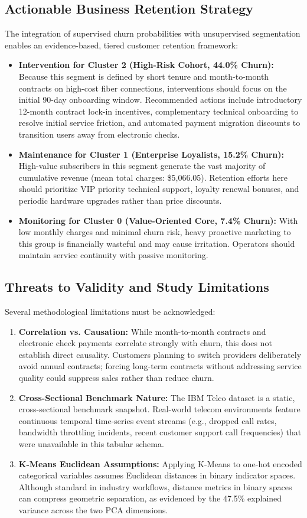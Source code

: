 \subsection{Actionable Business Retention Strategy}
The integration of supervised churn probabilities with unsupervised segmentation enables an evidence-based, tiered customer retention framework:
\begin{itemize}
    \item \textbf{Intervention for Cluster 2 (High-Risk Cohort, 44.0\% Churn):} Because this segment is defined by short tenure and month-to-month contracts on high-cost fiber connections, interventions should focus on the initial 90-day onboarding window. Recommended actions include introductory 12-month contract lock-in incentives, complementary technical onboarding to resolve initial service friction, and automated payment migration discounts to transition users away from electronic checks.
    \item \textbf{Maintenance for Cluster 1 (Enterprise Loyalists, 15.2\% Churn):} High-value subscribers in this segment generate the vast majority of cumulative revenue (mean total charges: \$5,066.05). Retention efforts here should prioritize VIP priority technical support, loyalty renewal bonuses, and periodic hardware upgrades rather than price discounts.
    \item \textbf{Monitoring for Cluster 0 (Value-Oriented Core, 7.4\% Churn):} With low monthly charges and minimal churn risk, heavy proactive marketing to this group is financially wasteful and may cause irritation. Operators should maintain service continuity with passive monitoring.
\end{itemize}

\subsection{Threats to Validity and Study Limitations}
Several methodological limitations must be acknowledged:
\begin{enumerate}
    \item \textbf{Correlation vs. Causation:} While month-to-month contracts and electronic check payments correlate strongly with churn, this does not establish direct causality. Customers planning to switch providers deliberately avoid annual contracts; forcing long-term contracts without addressing service quality could suppress sales rather than reduce churn.
    \item \textbf{Cross-Sectional Benchmark Nature:} The IBM Telco dataset is a static, cross-sectional benchmark snapshot. Real-world telecom environments feature continuous temporal time-series event streams (e.g., dropped call rates, bandwidth throttling incidents, recent customer support call frequencies) that were unavailable in this tabular schema.
    \item \textbf{K-Means Euclidean Assumptions:} Applying K-Means to one-hot encoded categorical variables assumes Euclidean distances in binary indicator spaces. Although standard in industry workflows, distance metrics in binary spaces can compress geometric separation, as evidenced by the 47.5\% explained variance across the two PCA dimensions.
\end{enumerate}
